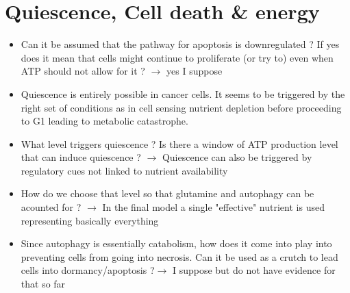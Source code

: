 \documentclass[11pt,a4paper]{article}
\begin{document}
\section{Quiescence, Cell death \& energy}
\begin{itemize}
\item Can it be assumed that the pathway for apoptosis is downregulated ? If yes does it mean that cells might continue to proliferate (or try to) even when ATP should not allow for it ? $\rightarrow$ yes I suppose
\item Quiescence is entirely possible in cancer cells. It seems to be triggered by the right set of conditions as in cell sensing nutrient depletion before proceeding to G1 leading to metabolic catastrophe.
\item What level triggers quiescence ? Is there a window of ATP production level that can induce quiescence ? $\rightarrow$ Quiescence can also be triggered by regulatory cues not linked to nutrient availability
\item How do we choose that level so that glutamine and autophagy can be acounted for ? $\rightarrow$ In the final model a single "effective" nutrient is used representing basically everything
\item Since autophagy is essentially catabolism, how does it come into play into preventing cells from going into necrosis. Can it be used as a crutch to lead cells into dormancy/apoptosis ?$\rightarrow$ I suppose but do not have evidence for that so far

\end{itemize}
\end{document}
